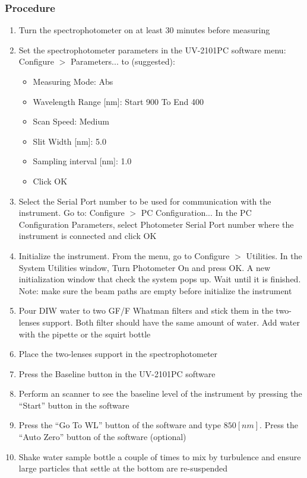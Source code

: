 \begin{appendices}
\subsubsection{Procedure}
\begin{enumerate}[itemsep=2pt,parsep=2pt]
  \item Turn the spectrophotometer on at least 30 minutes before measuring
  \item Set the spectrophotometer parameters in the UV-2101PC software menu: Configure $>$ Parameters... to (suggested):
  \begin{itemize}[itemsep=2pt,parsep=2pt]
    \item Measuring Mode: Abs
    \item Wavelength Range [nm]: Start 900 To End 400
    \item Scan Speed: Medium
    \item Slit Width [nm]: 5.0
    \item Sampling interval [nm]: 1.0
    \item Click OK
  \end{itemize}
  \item Select the Serial Port number to be used for communication with the instrument. Go to: Configure $>$ PC Configuration... In the PC Configuration Parameters, select Photometer Serial Port number where the instrument is connected and click OK
  \item Initialize the instrument. From the menu, go to Configure $>$ Utilities. In the System Utilities window, Turn Photometer On and press OK. A new initialization window that check the system pops up. Wait until it is finished. Note: make sure the beam paths are empty before initialize the instrument
  \item Pour DIW water to two GF/F Whatman filters and stick them in the two-lenses support. Both filter should have the same amount of water. Add water with the pipette or the squirt bottle
  \item Place the two-lenses support in the spectrophotometer
  \item Press the Baseline button in the UV-2101PC software
  \item Perform an scanner to see the baseline level of the instrument by pressing the ``Start'' button in the software
  \item Press the ``Go To WL'' button of the software and type $850 [nm]$. Press the ``Auto Zero'' button of the software (optional)
  \item Shake water sample bottle a couple of times to mix by turbulence and ensure large particles that settle at the bottom are re-suspended \cite{Mitchell2002}

\end{enumerate}
\end{appendices}
